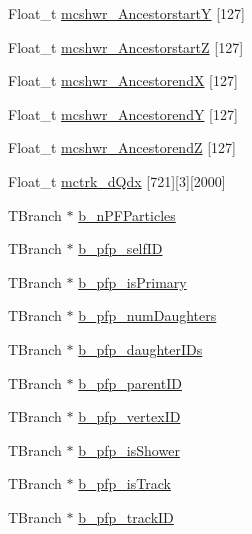 \begin{DoxyCompactItemize}
\item 
Float\-\_\-t \hyperlink{classanatree_ad608fa721bfee90d59e3cf792ae3460a}{mcshwr\-\_\-\-Ancestorstart\-Y} \mbox{[}127\mbox{]}
\item 
Float\-\_\-t \hyperlink{classanatree_a3c3b4c9ddd1edecd0ed57c74adc63cb5}{mcshwr\-\_\-\-Ancestorstart\-Z} \mbox{[}127\mbox{]}
\item 
Float\-\_\-t \hyperlink{classanatree_a07f9cb0a1300bbb50fee3da98fc497d1}{mcshwr\-\_\-\-Ancestorend\-X} \mbox{[}127\mbox{]}
\item 
Float\-\_\-t \hyperlink{classanatree_ad0fee09ac51f48a3c95ad66c317f1be2}{mcshwr\-\_\-\-Ancestorend\-Y} \mbox{[}127\mbox{]}
\item 
Float\-\_\-t \hyperlink{classanatree_a57ea4bb64cda0ccbf95ea173025ad6cb}{mcshwr\-\_\-\-Ancestorend\-Z} \mbox{[}127\mbox{]}
\item 
Float\-\_\-t \hyperlink{classanatree_ac631b769d22b8b76a18c3fb3b752cea8}{mctrk\-\_\-d\-Qdx} \mbox{[}721\mbox{]}\mbox{[}3\mbox{]}\mbox{[}2000\mbox{]}
\item 
T\-Branch $\ast$ \hyperlink{classanatree_a076fa2e9cde062e7e17eb5f581ac5cd3}{b\-\_\-n\-P\-F\-Particles}
\item 
T\-Branch $\ast$ \hyperlink{classanatree_ae9425db3876cb2e3a31cc309d51a6d18}{b\-\_\-pfp\-\_\-self\-I\-D}
\item 
T\-Branch $\ast$ \hyperlink{classanatree_aca2cc95738f07a0d84826c0b5bf9a157}{b\-\_\-pfp\-\_\-is\-Primary}
\item 
T\-Branch $\ast$ \hyperlink{classanatree_a7fcebaf222e83de0d99adfdc7f9fa26f}{b\-\_\-pfp\-\_\-num\-Daughters}
\item 
T\-Branch $\ast$ \hyperlink{classanatree_a099f2a6b079ed7ae439e5e7b70891d17}{b\-\_\-pfp\-\_\-daughter\-I\-Ds}
\item 
T\-Branch $\ast$ \hyperlink{classanatree_a7e044f6c5590fa78b2b1823e115f5cdf}{b\-\_\-pfp\-\_\-parent\-I\-D}
\item 
T\-Branch $\ast$ \hyperlink{classanatree_a858642ddaf2fec248175666bcd2426bf}{b\-\_\-pfp\-\_\-vertex\-I\-D}
\item 
T\-Branch $\ast$ \hyperlink{classanatree_a3ab0dea70b4f53a8b032b88fdaf370af}{b\-\_\-pfp\-\_\-is\-Shower}
\item 
T\-Branch $\ast$ \hyperlink{classanatree_a099a4bb742834bff882a66f9a202492b}{b\-\_\-pfp\-\_\-is\-Track}
\item 
T\-Branch $\ast$ \hyperlink{classanatree_a4c1146f762bca5b7a8582d694ea707d5}{b\-\_\-pfp\-\_\-track\-I\-D}
\item 

\end{DoxyCompactItemize}
